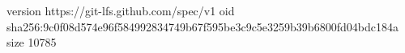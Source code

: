 version https://git-lfs.github.com/spec/v1
oid sha256:9c0f08d574e96f584992834749b67f595be3c9c5e3259b39b6800fd04bdc184a
size 10785
